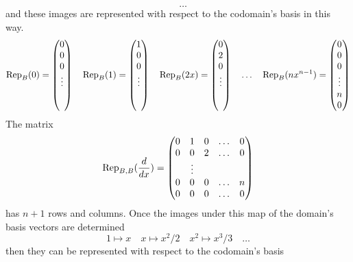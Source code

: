 \begin{exercises}
\begin{answer}
\begin{exparts}
\begin{equation*}
            \quad \ldots
          \end{equation*}
          and these images are represented with respect to the codomain's
          basis in this way.
          \begin{equation*}
            \rep{0}{B}=\colvec{0 \\ 0 \\ 0 \\ \vdots \\ \  \\  \ }
            \quad
            \rep{1}{B}=\colvec{1 \\ 0 \\ 0 \\ \vdots \\ \  \\ \ }
            \quad
            \rep{2x}{B}=\colvec{0 \\ 2 \\ 0 \\ \vdots \\ \  \\ \ }
            \quad\ldots\quad
            \rep{nx^{n-1}}{B}=\colvec{0 \\ 0 \\ 0 \\ \vdots \\ n \\ 0}
          \end{equation*}
          The matrix
          \begin{equation*}
            \rep{\frac{d}{dx}}{B,B}
            =\begin{pmatrix}
              0  &1  &0  &\ldots  &0  \\
              0  &0  &2  &\ldots  &0  \\
                 &\vdots             \\
              0  &0  &0  &\ldots  &n  \\
              0  &0  &0  &\ldots  &0
            \end{pmatrix}
          \end{equation*}
          has $n+1$ rows and columns.
       \partsitem Once the images under this map of the domain's basis
          vectors are determined
          \begin{equation*}
            1\mapsto x 
            \quad x\mapsto x^2/2  
            \quad x^2\mapsto x^3/3 
            \quad \ldots
          \end{equation*}
          then they can be represented with respect to the codomain's basis

\end{exparts}
\end{answer}
\end{exercises}
